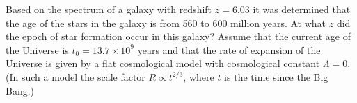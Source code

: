 Based on the spectrum of a galaxy with redshift $z = 6.03$ it was determined
that the age of the stars in the galaxy is from 560 to 600 million years. At
what $z$ did the epoch of star formation occur in this galaxy? Assume that the
current age of the Universe is $t_0 = 13.7 \times 10^{9}$ years and that the
rate of expansion of the Universe is given by a flat cosmological model with
cosmological constant $\Lambda = 0$. (In such a model the scale factor
$R \propto t^{2/3}$, where $t$ is the time since the Big Bang.)
